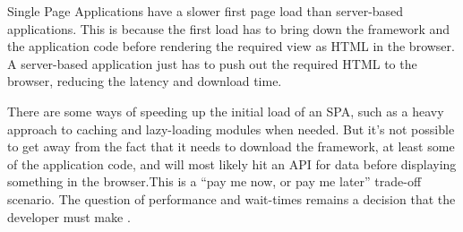 Single Page Applications have a slower first page load than server-based applications. This is because the first load has to bring down the framework and the application code before rendering the required view as HTML in the browser. A server-based application just has to push out the required HTML to the browser, reducing the latency and download time.


There are some ways of speeding up the initial load of an SPA, such as a heavy approach to caching and lazy-loading modules when needed. But it's not possible to get away from the fact that it needs to download the framework, at least some of the application code, and will most likely hit an API for data before displaying something in the browser.This is a ``pay me now, or pay me later'' trade-off scenario. The question of performance and wait-times remains a decision that the developer must make \cite{arc_over}.


